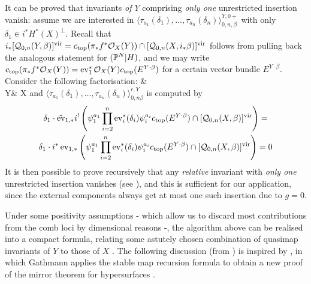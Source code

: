 It can be proved that invariants \emph{of $Y$} comprising \emph{only one} unrestricted insertion vanish: assume we are interested in $\langle\tau_{a_1}(\delta_1),\ldots,\tau_{a_n}(\delta_n)\rangle^{Y,0+}_{0,n,\beta}$ with only $\delta_1\in i^*H^*(X)^\perp$. Recall that $i_*[\mathcal{Q}_{0,n}(Y,\beta)]^{\mathrm{vir}}=c_{\text{top}}(\pi_*f^*\mathcal{O}_X(Y))\cap [\mathcal{Q}_{0,n}(X,i_*\beta)]^{\mathrm{vir}}$ follows from pulling back the analogous statement for $(\mathbb P^N|H)$, and we may write $c_{\text{top}}(\pi_*f^*\mathcal{O}_X(Y))=\operatorname{ev}_1^*\mathcal{O}_X(Y)c_{\text{top}}(E^{Y\cdot\beta})$ for a certain vector bundle $E^{Y\cdot\beta}$. Consider the following factorisation:
\bcd
{}\ar[r,"j"]\ar[d,"\tilde\ev_1"] & \ar[d,"\ev_1"] \\
Y\ar[r,"i"] & X
\ecd
and $\langle\tau_{a_1}(\delta_1),\ldots,\tau_{a_n}(\delta_n)\rangle^{\epsilon,Y}_{0,n\beta}$ is computed by
\begin{multline*}
 \delta_1\cdot\tilde{\operatorname{ev}}_{1,*}i^!\left(\psi_1^{a_1}\prod_{i=2}^n\operatorname{ev}_i^*(\delta_i)\psi_i^{a_i}c_{\text{top}}(E^{Y\cdot\beta})\cap[\mathcal{Q}_{0,n}(X,\beta)]^{\mathrm{vir}}\right)= \\
 \delta_1\cdot i^*\operatorname{ev}_{1,*}\left(\psi_1^{a_1}\prod_{i=2}^n\operatorname{ev}_i^*(\delta_i)\psi_i^{a_i}c_{\text{top}}(E^{Y\cdot\beta})\cap[\mathcal{Q}_{0,n}(X,\beta)]^{\mathrm{vir}}\right) =0
\end{multline*}
It is then possible to prove recursively that any \emph{relative} invariant with \emph{only one} unrestricted insertion vanishes (see \cite[Lemma 5.6]{Ga}), and this is sufficient for our application, since the external components always get at most one such insertion due to $g=0$.

\smallskip

Under some positivity assumptions - which allow us to discard most contributions from the comb loci by dimensional reasons -, the algorithm above can be realised into a compact formula, relating some astutely chosen combination of quasimap invariants of $Y$ to those of $X$ . The following discussion (from \cite[\S 5]{BN}) is inspired by \cite{Ga-MF}, in which Gathmann applies the stable map recursion formula to obtain a new proof of the mirror theorem for hypersurfaces \cite{Givental-equivariantGW}.

